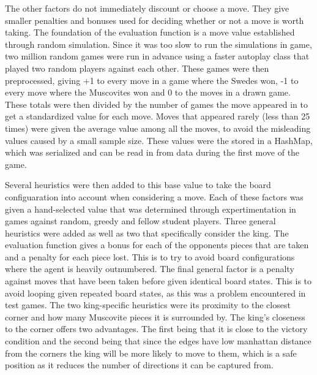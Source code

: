 \documentclass[11 pt, letter paper]{article}
\begin{document}
        The other factors do not immediately discount or choose a move.
        They give smaller penalties and bonuses used for deciding whether or not a move is worth taking.
        The foundation of the evaluation function is a move value established through random simulation.
        Since it was too slow to run the simulations in game, two million random games were run in advance
        using a faster autoplay class that played two random players against each other.
        These games were then preprocessed, giving +1 to every move in a game where the Swedes won, -1 to every move where the Muscovites won
        and 0 to the moves in a drawn game. These totals were then divided by the number of games the move appeared in to get a standardized value for each move.
        Moves that appeared rarely (less than 25 times) were given the average value among all the moves, to avoid the misleading values caused by a small sample size.
        These values were the stored in a HashMap, which was serialized and can be read in from data during the first move of the game.

        Several heuristics were then added to this base value to take the board configuaration into account when considering a move.
        Each of these factors was given a hand-selected value that was determined through expertimentation in games against random, greedy and fellow student players.
        Three general heuristics were added as well as two that specifically consider the king.
        The evaluation function gives a bonus for each of the opponents pieces that are taken and a penalty for each piece lost.
        This is to try to avoid board configurations where the agent is heavily outnumbered.
        The final general factor is a penalty against moves that have been taken before given identical board states.
        This is to avoid looping given repeated board states, as this was a problem encountered in test games.
        The two king-specific heuristics were its proximity to the closest corner and how many Muscovite pieces it is surrounded by.
        The king's closeness to the corner offers two advantages. The first being that it is close to the victory condition
        and the second being that since the edges have low manhattan distance from the corners the king will be more likely to
        move to them, which is a safe position as it reduces the number of directions it can be captured from.
\end{document}
